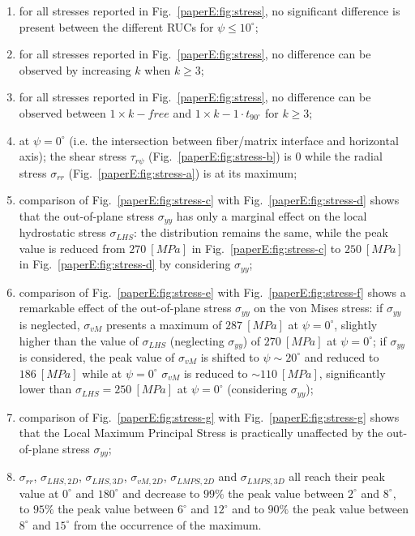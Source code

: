 \begin{enumerate}
\itemsep-0.5pt
\item for all stresses reported in Fig.~\ref{paperE:fig:stress}, no significant difference is present between the different RUCs for $\psi\leq10^{\circ}$;
\item for all stresses reported in Fig.~\ref{paperE:fig:stress}, no difference can be observed by increasing $k$ when $k\geq3$;
\item for all stresses reported in Fig.~\ref{paperE:fig:stress}, no difference can be observed between $1\times  k-free$ and $1\times  k-1\cdot t_{90^{\circ}}$ for $k\geq3$;
\item at $\psi=0^{\circ}$ (i.e. the intersection between fiber/matrix interface and horizontal axis); the shear stress $\tau_{r\psi}$ (Fig.~\ref{paperE:fig:stress-b}) is $0$ while the radial stress $\sigma_{rr}$ (Fig.~\ref{paperE:fig:stress-a}) is at its maximum;
\item comparison of Fig.~\ref{paperE:fig:stress-c} with Fig.~\ref{paperE:fig:stress-d} shows that the out-of-plane stress $\sigma_{yy}$ has only a marginal effect on the local hydrostatic stress $\sigma_{LHS}$: the distribution remains the same, while the peak value is reduced from $270\ \left[MPa\right]$ in Fig.~\ref{paperE:fig:stress-c} to $250\ \left[MPa\right]$ in Fig.~\ref{paperE:fig:stress-d} by considering $\sigma_{yy}$;
\item comparison of Fig.~\ref{paperE:fig:stress-e} with Fig.~\ref{paperE:fig:stress-f} shows a remarkable effect of the out-of-plane stress $\sigma_{yy}$ on the von Mises stress: if $\sigma_{yy}$ is neglected, $\sigma_{vM}$ presents a maximum of $287\ \left[MPa\right]$ at $\psi=0^{\circ}$, slightly higher than the value of $\sigma_{LHS}$ (neglecting $\sigma_{yy}$) of $270\ \left[MPa\right]$ at $\psi=0^{\circ}$; if $\sigma_{yy}$ is considered, the peak value of $\sigma_{vM}$ is shifted to $\psi\sim20^{\circ}$ and reduced to $186\ \left[MPa\right]$ while at $\psi=0^{\circ}$ $\sigma_{vM}$ is reduced to $\sim110\ \left[MPa\right]$, significantly lower than $\sigma_{LHS}=250\ \left[MPa\right]$ at $\psi=0^{\circ}$ (considering $\sigma_{yy}$);
\item comparison of Fig.~\ref{paperE:fig:stress-g} with Fig.~\ref{paperE:fig:stress-g} shows that the Local Maximum Principal Stress is practically unaffected by the out-of-plane stress $\sigma_{yy}$;
\item $\sigma_{rr}$, $\sigma_{LHS,2D}$, $\sigma_{LHS,3D}$, $\sigma_{vM,2D}$, $\sigma_{LMPS,2D}$ and $\sigma_{LMPS,3D}$ all reach their peak value at $0^{\circ}$ and $180^{\circ}$ and decrease to $99\%$ the peak value between $2^{\circ}$ and $8^{\circ}$, to $95\%$ the peak value between $6^{\circ}$ and $12^{\circ}$ and to $90\%$ the peak value between $8^{\circ}$ and $15^{\circ}$ from the occurrence of the maximum.
\end{enumerate}
